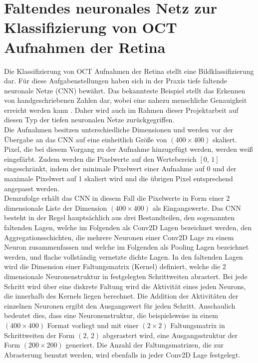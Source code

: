 \section{Faltendes neuronales Netz zur Klassifizierung von OCT Aufnahmen der Retina}


Die Klassifizierung von OCT Aufnahmen der Retina stellt eine Bildklassifizierung dar. Für diese Aufgabenstellungen haben sich in der Praxis tiefe faltende neuronale Netze (CNN) bewährt. Das bekannteste Beispiel stellt das Erkennen von handgeschriebenen Zahlen dar, wobei eine nahezu menschliche Genauigkeit erreicht werden kann \cite{MNIST}. Daher wird auch im Rahmen dieser Projektarbeit auf diesen Typ der tiefen neuronalen Netze zurückgegriffen. \\
Die Aufnahmen besitzen unterschiedliche Dimensionen und werden vor der Übergabe an das CNN auf eine einheitlich Größe von $(400\times 400)$ skaliert. Pixel, die bei diesem Vorgang zu der Aufnahme hinzugefügt werden, werden weiß eingefärbt. Zudem werden die Pixelwerte auf den Wertebereich $[0,\,1]$ eingeschränkt, indem der minimale Pixelwert einer Aufnahme auf 0 und der maximale Pixelwert auf 1 skaliert wird und die übrigen Pixel entsprechend angepasst werden. \\ 
Demzufolge erhält das CNN in diesem Fall die Pixelwerte in Form einer 2 dimensionale Liste der Dimension $(400\times 400)$ als Eingangswerte. Das CNN besteht in der Regel hauptsächlich aus drei Bestandteilen, den sogenannten faltenden Lagen, welche im Folgenden als Conv2D Lagen bezeichnet werden, den Aggregationsschichten, die mehrere Neuronen einer Conv2D Lage zu einem Neuron zusammenfassen und welche im Folgenden als Pooling Lagen bezeichnet werden, und flache vollständig vernetzte dichte Lagen. In den faltenden Lagen wird die Dimension einer Faltungsmatrix (Kernel) definiert, welche die 2 dimensionale Neuronenstruktur in festgelegten Schrittweiten abrastert. Bei jede Schritt wird über eine diskrete Faltung wird die Aktivität eines jeden Neurons, die innerhalb des Kernels liegen berechnet. Die Addition der Aktivitäten der einzelnen Neuronen ergibt den Ausgangswert für jeden Schritt. Anschaulich bedeutet dies, dass eine Neuronenstruktur, die beispielsweise in einem $(400\times 400)$ Format vorliegt und mit einer $(2 \times 2)$ Faltungsmatrix in Schrittweiten der Form $(2,\,2)$ abgerastert wird, eine Ausgangsstruktur der Form $(200\times 200)$ generiert. Die Anzahl der Faltungsmatrizen, die zur Abrasterung benutzt werden, wird ebenfalls in jeder Conv2D Lage festgelegt.  \\
